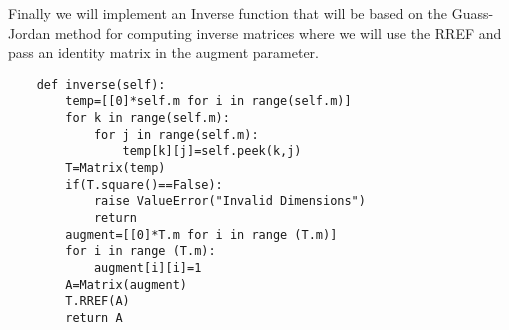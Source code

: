  Finally we will implement an Inverse function that will be based on the Guass-Jordan method for computing inverse matrices where we will use the RREF and pass an identity matrix in the augment parameter.
 \begin{lstlisting}
    def inverse(self):
        temp=[[0]*self.m for i in range(self.m)]
        for k in range(self.m):
            for j in range(self.m):
                temp[k][j]=self.peek(k,j)
        T=Matrix(temp)
        if(T.square()==False):
            raise ValueError("Invalid Dimensions")
            return
        augment=[[0]*T.m for i in range (T.m)]
        for i in range (T.m):
            augment[i][i]=1
        A=Matrix(augment)
        T.RREF(A)
        return A
 \end{lstlisting}